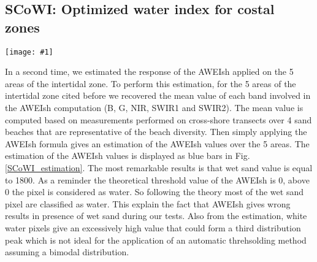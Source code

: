 \documentclass[remotesensing,article,submit,pdftex,moreauthors]{Definitions/mdpi}
\newcommand{\myfigure}[4]{
    \begin{figure*}[h!]
        \centering
        \texttt{[image: \#1]}	 
        \caption{\itshape#2}
        \label{#3}
    \end{figure*} 
}
\begin{document}
\subsection{SCoWI: Optimized water index for costal zones}\label{SCOWI_sec}

\myfigure{img/SCoWI_estimation.png}{Comparison of the estimated values of the SCoWI (orange bars) against the AWEIsh (blue bars) over the 5 areas of the intertidal zone. The SCoWI has a very much lower estimated value than AWEIsh on the white-water and wet sand area, optimising the extraction of the waterline indicator.}{SCoWI_estimation}{1}

In a second time, we estimated the response of the AWEIsh applied on the 5 areas of the intertidal zone.
To perform this estimation, for the 5 areas of the intertidal zone cited before we recovered the mean value of each band involved in the AWEIsh computation (B, G, NIR, SWIR1 and SWIR2).
The mean value is computed based on measurements performed on cross-shore transects over 4 sand beaches that are representative of the beach diversity. %
Then simply applying the AWEIsh formula gives an estimation of the AWEIsh values over the 5 areas.
The estimation of the AWEIsh values is displayed as blue bars in Fig.\ref{SCoWI_estimation}.
The most remarkable results is that wet sand value is equal to 1800.
As a reminder the theoretical threshold value of the AWEIsh is 0, above 0 the pixel is considered as water.
So following the theory most of the wet sand pixel are classified as water.
This explain the fact that AWEIsh gives wrong results in presence of wet sand during our tests.
Also from the estimation, white water pixels give an excessively high value that could form a third distribution peak which is not ideal for the application of an automatic threhsolding method assuming a bimodal distribution.
\end{document}
